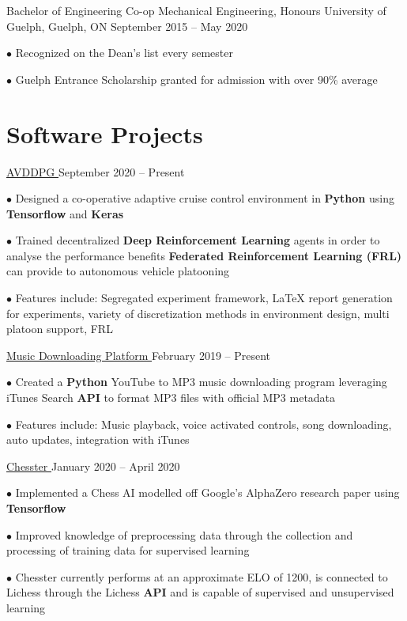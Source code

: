 \documentclass[a4paper,11pt]{article}
\newcommand{\github}{cboin1996} %
\newcommand{\sectionsep}{\vspace{-2.5mm}}
\begin{document}
\resumeEdu
{Bachelor of Engineering Co-op Mechanical Engineering, Honours }
{University of Guelph, Guelph, ON}
{September 2015 -- May 2020}
{}

\resumeItemListStart
\item[$\bullet$] Recognized on the Dean's list every semester
\item[$\bullet$] Guelph Entrance Scholarship granted for admission with over 90\% average
\resumeItemListEnd
\resumeSubHeadingListEnd
\sectionsep

\section{Software Projects}
\resumeSubHeadingListStart

\resumeProject
{\href{https://github.com/\github/avddpg}{AVDDPG \footnotesize{\faExternalLink}}}
{September 2020 -- Present} %
\resumeItemListStart
\item[$\bullet$] Designed a co-operative adaptive cruise control environment in \textbf{Python} using \textbf{Tensorflow} and
\textbf{Keras}
\item[$\bullet$] Trained decentralized \textbf{Deep Reinforcement Learning} agents in order to analyse the performance benefits \textbf{Federated Reinforcement Learning (FRL)}
can provide to autonomous vehicle platooning
\item[$\bullet$] Features include: Segregated experiment framework, \LaTeX \hspace{0.5pt} report generation for experiments,
variety of discretization methods in environment design, multi platoon support, FRL
\resumeItemListEnd

\resumeProject
{\href{https://github.com/cboin1996/JukeBox}{Music Downloading Platform \footnotesize{\faExternalLink}}} %
{February 2019 -- Present} %
\resumeItemListStart
\item[$\bullet$] Created a \textbf{Python} YouTube to MP3 music downloading program leveraging iTunes Search \textbf{API} to format
MP3 files with official MP3 metadata
\item[$\bullet$] Features include: Music playback, voice activated controls, song downloading, auto updates,
integration with iTunes
\resumeItemListEnd

\resumeProject
{\href{https://github.com/cboin1996/Chesster}{Chesster \footnotesize{\faExternalLink}}} %
{January 2020 -- April 2020} %
\resumeItemListStart
\item[$\bullet$] Implemented a Chess AI modelled off Google's AlphaZero research paper using \textbf{Tensorflow}
\item[$\bullet$] Improved knowledge of preprocessing data through the collection and processing of training data
for supervised learning
\item[$\bullet$] Chesster currently performs at an approximate ELO of 1200, is connected to Lichess through the
Lichess \textbf{API} and is capable of supervised and unsupervised learning
\resumeItemListEnd
\end{document}
